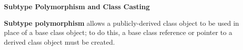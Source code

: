 \documentclass[7pt, twocolumn]{extarticle}
\newcommand{\myinline}[1]{\lstinline[basicstyle={\fontsize{5pt}{6}\ttfamily}]{#1}}
\begin{document}
\begin{small}


\textcolor{headcolor}{\textbf{Subtype Polymorphism and Class Casting}}
\vspace{0pt}

\textbf{Subtype polymorphism} allows a publicly-derived class object to be used in place of a base class object; to do this, a base class reference or pointer to a derived class object must be created.





\end{small}
\end{document}
